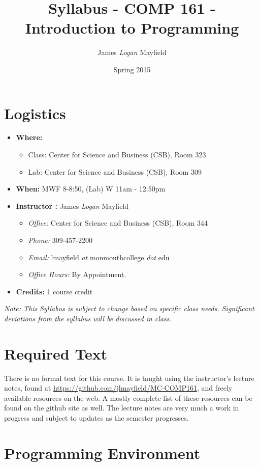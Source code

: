 \documentclass[10pt]{article}
\title{Syllabus - COMP 161 - Introduction to Programming}
\author{ James \textit{Logan} Mayfield }
\date{Spring 2015}
\begin{document}
\maketitle

\section{Logistics}
\begin{itemize}
\item \textbf{Where: } 
\begin{itemize} 
\item Class: Center for Science and Business (CSB), Room 323	
\item Lab: Center for Science and Business (CSB), Room 309
\end{itemize}
\item \textbf{When: } MWF 8-8:50, (Lab) W 11am - 12:50pm
\item \textbf{Instructor :} James \textit{Logan} Mayfield
\begin{itemize}
\item \textit{Office: } Center for Science and Business (CSB), Room 344
\item \textit{Phone: } 309-457-2200
\item \textit{Email: } lmayfield \textit{at} monmouthcollege \textit{dot} edu
\item \textit{Office Hours: }  By Appointment.
\end{itemize}
\item \textbf{Credits: } 1 course credit
\end{itemize}
\emph{Note: This Syllabus is subject to change based on specific class needs. Significant deviations from the syllabus will be discussed in class.}

\section{Required Text}

There is no formal text for this course. It is taught using the instructor's lecture notes, found at \url{https://github.com/jlmayfield/MC-COMP161}, and freely available resources on the web.  A mostly complete list of these resources can be found on the github site as well. The lecture notes are very much a work in progress and subject to updates as the semester progresses.  

\section{Programming Environment}
\end{document}
